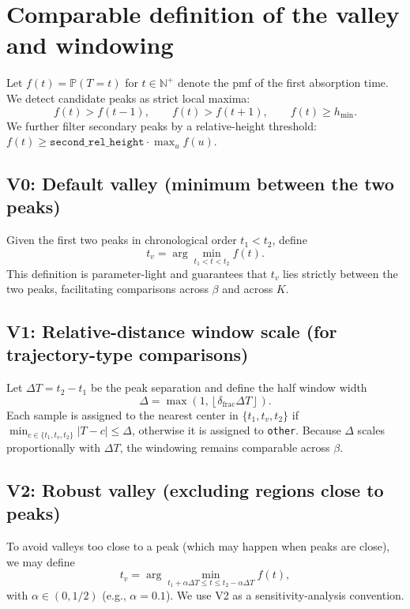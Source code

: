 \section{Comparable definition of the valley and windowing}

Let $f(t)=\mathbb{P}(T=t)$ for $t\in\mathbb{N}^+$ denote the pmf of the first absorption time.
We detect candidate peaks as strict local maxima:
\begin{equation}
f(t)>f(t-1),\qquad f(t)>f(t+1),\qquad f(t)\ge h_{\min}.
\end{equation}
We further filter secondary peaks by a relative-height threshold:
$f(t)\ge \texttt{second\_rel\_height}\cdot \max_{u} f(u)$.

\subsection{V0: Default valley (minimum between the two peaks)}
Given the first two peaks in chronological order $t_1<t_2$, define
\begin{equation}
t_v=\arg\min_{t_1<t<t_2} f(t).
\end{equation}
This definition is parameter-light and guarantees that $t_v$ lies strictly between the two peaks,
facilitating comparisons across $\beta$ and across $K$.

\subsection{V1: Relative-distance window scale (for trajectory-type comparisons)}
Let $\Delta T=t_2-t_1$ be the peak separation and define the half window width
\begin{equation}
\Delta=\max\left(1,\left\lfloor \delta_{\mathrm{frac}}\Delta T\right\rfloor\right).
\end{equation}
Each sample is assigned to the nearest center in $\{t_1,t_v,t_2\}$ if
$\min_{c\in\{t_1,t_v,t_2\}} |T-c|\le \Delta$, otherwise it is assigned to \texttt{other}.
Because $\Delta$ scales proportionally with $\Delta T$, the windowing remains comparable across $\beta$.

\subsection{V2: Robust valley (excluding regions close to peaks)}
To avoid valleys too close to a peak (which may happen when peaks are close),
we may define
\begin{equation}
t_v=\arg\min_{t_1+\alpha\Delta T\le t\le t_2-\alpha\Delta T} f(t),
\end{equation}
with $\alpha\in(0,1/2)$ (e.g., $\alpha=0.1$). We use V2 as a sensitivity-analysis convention.

